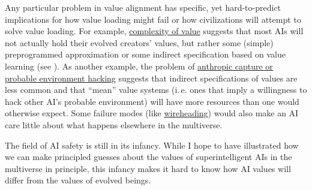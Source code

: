 \documentclass[]{article}
\begin{document}
Any particular problem in value alignment has specific, yet
hard-to-predict implications for how value loading might fail or how
civilizations will attempt to solve value loading. For example,
\href{https://wiki.lesswrong.com/wiki/Complexity_of_value}{complexity
of value} suggests that most AIs will not actually hold their evolved
creators' values, but rather some (simple) preprogrammed approximation
or some indirect specification based on value learning (see
\cite{Bostrom2014-ay}). As another example, the problem of
\href{https://arbital.com/p/probable_environment_hacking/}{anthropic capture or probable
environment hacking} suggests that indirect specifications of values are less common and that
``mean'' value systems (i.\,e. ones that imply a willingness to hack other AI's probable environment)
will have more resources than one would otherwise expect.  Some failure modes (like
\href{https://casparoesterheld.com/2016/07/08/wireheading/}{wireheading}) would also make an
AI care little about what happens elsewhere in the multiverse.

The field of AI safety is still in its infancy. While I hope to have
illustrated how we can make principled guesses about the values of
superintelligent AIs in the multiverse in principle, this infancy makes
it hard to know how AI values will differ from the values of evolved
beings.

\begin{sloppypar} %
\printbibliography
\end{sloppypar}
\end{document}
